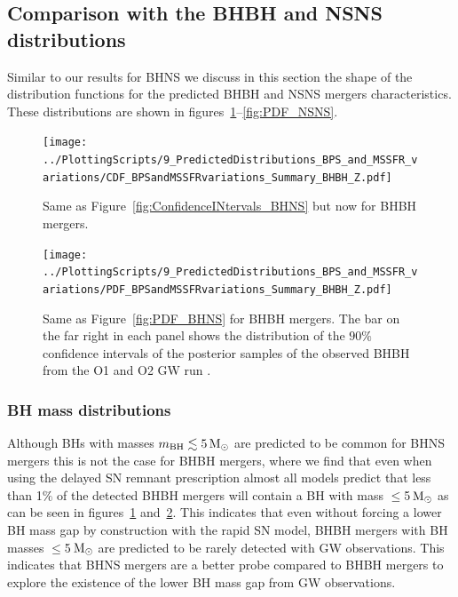 \documentclass[twocolumn]{aastex63}
\newcommand\bhnsSingle{BHNS\xspace}
\newcommand{\Msun}{\ensuremath{\,\rm{M}_{\odot}}\xspace}
\newcommand{\mbhf}{\ensuremath{m_{\rm{BH}}}\xspace}
\begin{document}
%

\subsection{Comparison with the \ac{BHBH} and \ac{NSNS} distributions}
%
Similar to our results for \bhnsSingle we discuss in this section the shape of the  distribution functions for the   predicted \ac{BHBH} and \ac{NSNS} mergers characteristics.  These distributions are shown in figures~\ref{fig:ConfidenceINtervals_BHBH}--\ref{fig:PDF_NSNS}. 
%
\begin{figure}
    \centering
\texttt{[image: ../PlottingScripts/9\_PredictedDistributions\_BPS\_and\_MSSFR\_variations/CDF\_BPSandMSSFRvariations\_Summary\_BHBH\_Z.pdf]} %
\caption{Same as Figure~\ref{fig:ConfidenceINtervals_BHNS} but now for \ac{BHBH} mergers.}
    \label{fig:ConfidenceINtervals_BHBH}
\end{figure}
%


\begin{figure}
    \centering
%
\texttt{[image: ../PlottingScripts/9\_PredictedDistributions\_BPS\_and\_MSSFR\_variations/PDF\_BPSandMSSFRvariations\_Summary\_BHBH\_Z.pdf]} %
%
    \caption{Same as Figure~\ref{fig:PDF_BHNS}  for \ac{BHBH} mergers. The bar on the far right in each panel shows the distribution of the $90\%$ confidence intervals of the posterior samples of the observed BHBH from the O1 and O2 \ac{GW} run \citep{2019PhRvX...9c1040A}.  }
    \label{fig:PDF_BHBH}
\end{figure}
%


\subsubsection{BH mass distributions}
Although  \acp{BH} with  masses $\mbhf \lesssim 5\Msun$ are predicted to be common for \bhnsSingle mergers  this is not the case for \ac{BHBH} mergers, where we find that even when using the delayed SN remnant prescription  almost all models predict that less than 1$\%$ of the detected \ac{BHBH} mergers will contain a \ac{BH} with mass $\leq$5\Msun as can be seen in figures~\ref{fig:ConfidenceINtervals_BHBH} and~\ref{fig:PDF_BHBH}.  This indicates that even without forcing a lower \ac{BH} mass gap by construction with the rapid SN model,  \ac{BHBH} mergers with   \ac{BH} masses  $\leq$5\Msun  are predicted to be rarely detected with \ac{GW} observations. This indicates that  \bhnsSingle mergers are a better probe  compared to \ac{BHBH} mergers to explore the existence of the lower \ac{BH}  mass gap from  \ac{GW} observations. 
\end{document}
